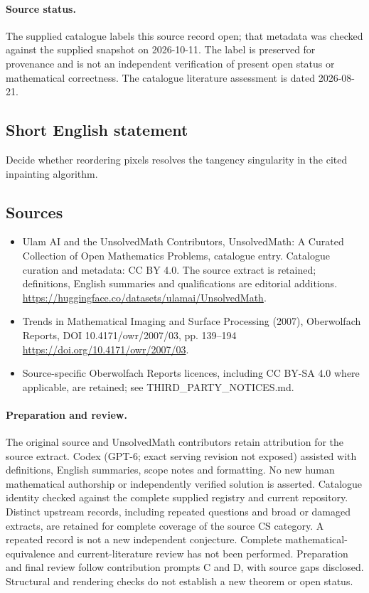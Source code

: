 \documentclass[11pt]{article}
\begin{document}
\paragraph{Source status.}
The supplied catalogue labels this source record open; that metadata was checked against the supplied snapshot on 2026-10-11. The label is preserved for provenance and is not an independent verification of present open status or mathematical correctness. The catalogue literature assessment is dated 2026-08-21.
\subsection{Short English statement}
Decide whether reordering pixels resolves the tangency singularity in the cited inpainting algorithm.
\subsection{Sources}
\begin{itemize}
\item[S1] Ulam AI and the UnsolvedMath Contributors, UnsolvedMath: A Curated Collection of Open Mathematics Problems, catalogue entry. Catalogue curation and metadata: CC BY 4.0. The source extract is retained; definitions, English summaries and qualifications are editorial additions.
\url{https://huggingface.co/datasets/ulamai/UnsolvedMath}.
\item[S2] Trends in Mathematical Imaging and Surface Processing (2007), Oberwolfach Reports, DOI 10.4171/owr/2007/03, pp. 139--194
\url{https://doi.org/10.4171/owr/2007/03}.
\item Source-specific Oberwolfach Reports licences, including CC BY-SA 4.0 where applicable, are retained; see THIRD\_PARTY\_NOTICES.md.
\end{itemize}
\paragraph{Preparation and review.}
The original source and UnsolvedMath contributors retain attribution for the source extract. Codex (GPT-6; exact serving revision not exposed) assisted with definitions, English summaries, scope notes and formatting. No new human mathematical authorship or independently verified solution is asserted. Catalogue identity checked against the complete supplied registry and current repository. Distinct upstream records, including repeated questions and broad or damaged extracts, are retained for complete coverage of the source CS category. A repeated record is not a new independent conjecture. Complete mathematical-equivalence and current-literature review has not been performed. Preparation and final review follow contribution prompts C and D, with source gaps disclosed. Structural and rendering checks do not establish a new theorem or open status.
\label{end:statement}
\end{document}

